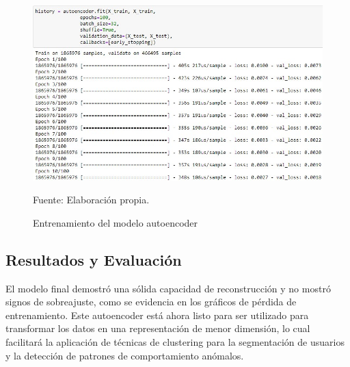 \begin{figure}[H]
    \begin{minipage}[t]{0.9\textwidth}
        \caption{Entrenamiento del modelo autoencoder}
        \label{entrenamiento_autoencoder}        
    \end{minipage}

    \vspace{10pt}

    \begin{minipage}[b]{0.99\textwidth}
        \centering
        \includegraphics[width=\textwidth]{img/Entrenamiento autoencoder.jpg}        
    \end{minipage}

    \begin{minipage}[t]{0.9\textwidth}
        Fuente: Elaboración propia.
    \end{minipage}
\end{figure}

\subsection{Resultados y Evaluación}

El modelo final demostró una sólida capacidad de reconstrucción y no mostró signos de sobreajuste, como se evidencia en los gráficos de pérdida de entrenamiento. Este autoencoder está ahora listo para ser utilizado para transformar los datos en una representación de menor dimensión, lo cual facilitará la aplicación de técnicas de clustering para la segmentación de usuarios y la detección de patrones de comportamiento anómalos.

